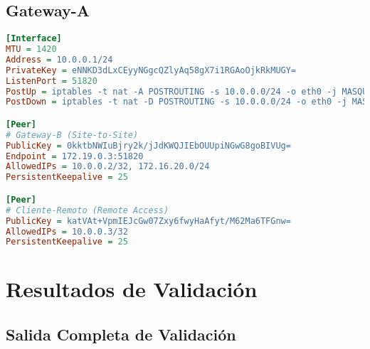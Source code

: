 \subsection{Gateway-A}

\begin{lstlisting}[language=ini, caption=config/gateway-a/wg0.conf]
[Interface]
MTU = 1420
Address = 10.0.0.1/24
PrivateKey = eNNKD3dLxCEyyNGgcQZlyAq58gX7i1RGAoOjkRkMUGY=
ListenPort = 51820
PostUp = iptables -t nat -A POSTROUTING -s 10.0.0.0/24 -o eth0 -j MASQUERADE; iptables -A FORWARD -i wg0 -j ACCEPT; iptables -A FORWARD -o wg0 -j ACCEPT
PostDown = iptables -t nat -D POSTROUTING -s 10.0.0.0/24 -o eth0 -j MASQUERADE; iptables -D FORWARD -i wg0 -j ACCEPT; iptables -D FORWARD -o wg0 -j ACCEPT

[Peer]
# Gateway-B (Site-to-Site)
PublicKey = 0kktbNWIuBjry2k/jJdKWQJIEbOUUpiNGwG8goBIVUg=
Endpoint = 172.19.0.3:51820
AllowedIPs = 10.0.0.2/32, 172.16.20.0/24
PersistentKeepalive = 25

[Peer]
# Cliente-Remoto (Remote Access)
PublicKey = katVAt+VpmIEJcGw07Zxy6fwyHaAfyt/M62Ma6TFGnw=
AllowedIPs = 10.0.0.3/32
PersistentKeepalive = 25
\end{lstlisting}

\section{Resultados de Validación}

\subsection{Salida Completa de Validación}

